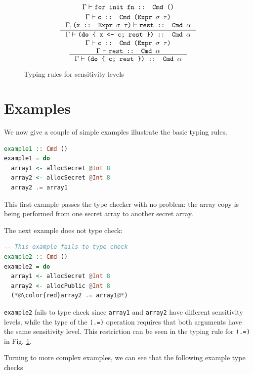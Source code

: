 \documentclass[10pt, conference]{IEEEtran}
\newcommand{\ttt}{\texttt}
\begin{document}
\begin{figure}
{\begin{minipage}{\linewidth}
\begin{gather*}
{    }{\Gamma \vdash \ttt{for init fn :: Cmd ()}}\\
  \inference{%
    \Gamma \vdash \ttt{c :: Cmd (Expr $\sigma$ $\tau$)}
    \\ \Gamma,\ttt{(x :: Expr $\sigma$ $\tau$)} \vdash \ttt{rest :: Cmd $\alpha$}
  }{%
    \Gamma \vdash \ttt{(\textbf{do} \{ x <- c; rest \}) :: Cmd $\alpha$}
  }\\
  \inference{%
    \Gamma \vdash \ttt{c :: Cmd (Expr $\sigma$ $\tau$)}
    \\ \Gamma \vdash \ttt{rest :: Cmd $\alpha$}
  }{%
    \Gamma \vdash \ttt{(\textbf{do} \{ c; rest \}) :: Cmd $\alpha$}
  }
\end{gather*}
\end{minipage}}
  \caption{Typing rules for sensitivity levels}
\label{fig:SensTypes}
\end{figure}

\section{Examples}
\label{sec:Examples}

We now give a couple of simple examples illustrate the basic typing rules.

\begin{lstlisting}[language=haskell]
example1 :: Cmd ()
example1 = do
  array1 <- allocSecret @Int 8
  array2 <- allocSecret @Int 8
  array2 .= array1
\end{lstlisting}

\noindent This first example passes the type checker with no problem: the array copy
is being performed from one secret array to another secret array.

The next example does not type check:

\pagebreak
\begin{lstlisting}[language=haskell]
  -- This example fails to type check
example2 :: Cmd ()
example2 = do
  array1 <- allocSecret @Int 8
  array2 <- allocPublic @Int 8
  (*@\color{red}array2 .= array1@*)
\end{lstlisting}

\noindent \ttt{example2} fails to type check since \ttt{array1} and \ttt{array2} have
different sensitivity levels, while the type of the \ttt{(.=)} operation
requires that both arguments have the same sensitivity level. This restriction can
be seen in the typing rule for \ttt{(.=)} in Fig. \ref{fig:SensTypes}.

Turning to more complex examples, we can see that the following example type checks
\end{document}

